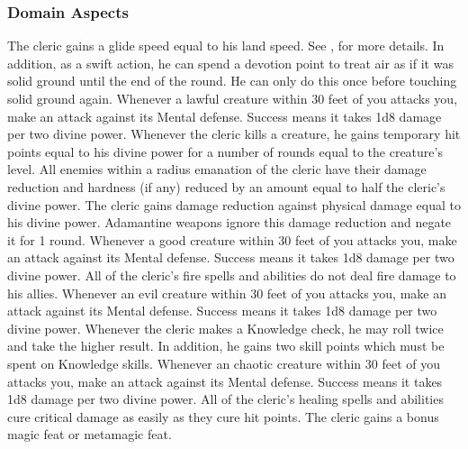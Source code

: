 \subsubsection{Domain Aspects}\label{Domain Aspects}

    The cleric gains a glide speed equal to his land speed.
    See , for more details.
    In addition, as a swift action, he can spend a devotion point to treat air as if it was solid ground until the end of the round.
    He can only do this once before touching solid ground again.
    Whenever a lawful creature within 30 feet of you attacks you, make an attack against its Mental defense.
    Success means it takes 1d8 damage per two divine power.
    Whenever the cleric kills a creature, he gains temporary hit points equal to his divine power for a number of rounds equal to the creature's level.
    All enemies within a \areamed radius emanation of the cleric have their damage reduction and hardness (if any) reduced by an amount equal to half the cleric's divine power.
    The cleric gains damage reduction against physical damage equal to his divine power.
    Adamantine weapons ignore this damage reduction and negate it for 1 round.
    Whenever a good creature within 30 feet of you attacks you, make an attack against its Mental defense.
    Success means it takes 1d8 damage per two divine power.
    All of the cleric's fire spells and abilities do not deal fire damage to his allies.
    Whenever an evil creature within 30 feet of you attacks you, make an attack against its Mental defense.
    Success means it takes 1d8 damage per two divine power.
    Whenever the cleric makes a Knowledge check, he may roll twice and take the higher result.
    In addition, he gains two skill points which must be spent on Knowledge skills.
    Whenever an chaotic creature within 30 feet of you attacks you, make an attack against its Mental defense.
    Success means it takes 1d8 damage per two divine power.
    All of the cleric's healing spells and abilities cure critical damage as easily as they cure hit points.
    The cleric gains a bonus magic feat or metamagic feat.
